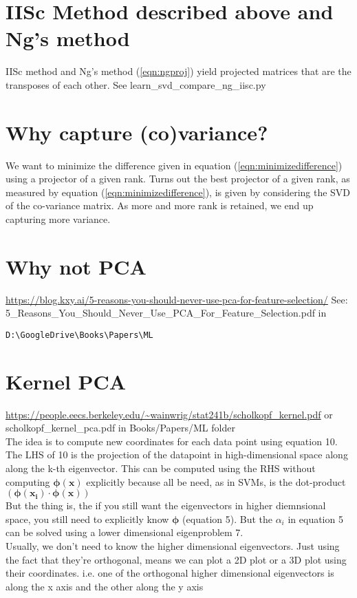 \documentclass{article}
\begin{document}
\section{IISc Method described above and Ng's method}
IISc method and Ng's method (\ref{eqn:ngproj}) yield projected matrices that are the transposes of each other. See learn\_svd\_compare\_ng\_iisc.py
\begin{center}
  
\end{center}  
%
%
%
\section{Why capture (co)variance?}
We want to minimize the difference given in equation (\ref{eqn:minimizedifference}) using a projector of a given rank. Turns out the best projector of a given rank, as measured by equation (\ref{eqn:minimizedifference}), is given by considering the SVD of the co-variance matrix. As more and more rank is retained, we end up capturing more variance.
%
%
%
\section{Why not PCA}
\url{https://blog.kxy.ai/5-reasons-you-should-never-use-pca-for-feature-selection/} See: 5\_Reasons\_You\_Should\_Never\_Use\_PCA\_For\_Feature\_Selection.pdf in
\begin{verbatim}
D:\GoogleDrive\Books\Papers\ML
\end{verbatim}
%
%
%
\section{Kernel PCA}
\url{https://people.eecs.berkeley.edu/~wainwrig/stat241b/scholkopf_kernel.pdf} or scholkopf\_kernel\_pca.pdf in Books/Papers/ML folder\\
The idea is to compute new coordinates for each data point using equation 10. The LHS of 10 is the projection of the datapoint in high-dimensional space along along the k-th eigenvector. This can be computed using the RHS without computing $\pmb{\phi}(\pmb{x})$ explicitly because all be need, as in SVMs, is the dot-product $(\pmb{\phi}(\pmb{x_i})\cdot\pmb{\phi}(\pmb{x}))$\\

But the thing is, the if you still want the eigenvectors in higher diemnsional space, you still need to explicitly know $\pmb{\phi}$ (equation 5). But the $\alpha_i$ in equation 5 can be solved using a lower dimensional eigenproblem 7. \\

Usually, we don't need to know the higher dimensional eigenvectors. Just using the fact that they're orthogonal, means we can plot a 2D plot or a 3D plot using their coordinates. i.e. one of the orthogonal higher dimensional eigenvectors is along the x axis and the other along the y axis
\end{document}
